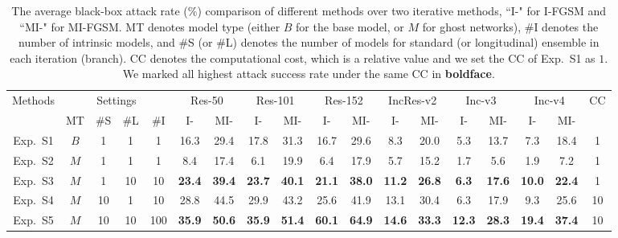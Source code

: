 \documentclass[letterpaper]{article} %
\begin{document}
\begin{table}[tb]
\centering
\small
\begin{tabular}{|c|cccc||cc|cc|cc|cc|cc|cc||c|}
\hline
\multirow{2}{*}{Methods} & \multicolumn{4}{c||}{Settings} & \multicolumn{2}{c|}{Res-50} & \multicolumn{2}{c|}{Res-101} & \multicolumn{2}{c|}{Res-152} & \multicolumn{2}{c|}{IncRes-v2} & \multicolumn{2}{c|}{Inc-v3} & \multicolumn{2}{c||}{Inc-v4} & \multirow{2}{*}{CC}\\
\cline{2-17}
& MT & \#S & \#L & \#I & I- & MI- & I- & MI- & I- & MI- & I- & MI- & I- & MI- & I- & MI- &\\
\hline
\hline
Exp.~S1 & $B$ & 1  & 1  &   1 & 16.3 & 29.4 & 17.8 & 31.3 & 16.7 & 29.6 &  8.3 & 20.0 &  5.3 & 13.7 &  7.3 & 18.4 & 1 \\
Exp.~S2 & $M$ & 1  & 1  &   1 &  8.4 & 17.4 &  6.1 & 19.9 &  6.4 & 17.9 &  5.7 & 15.2 &  1.7 &  5.6 &  1.9 &  7.2 & 1 \\
Exp.~S3 & $M$ & 1  & 10 &  10 & \textbf{23.4} & \textbf{39.4} & \textbf{23.7} & \textbf{40.1} & \textbf{21.1} & \textbf{38.0} & \textbf{11.2} & \textbf{26.8} &  \textbf{6.3} & \textbf{17.6} & \textbf{10.0} & \textbf{22.4} & 1 \\ \hline
Exp.~S4 & $M$ & 10 & 1  &  10 & 28.8 & 44.5 & 29.9 & 43.2 & 25.6 & 41.9 & 13.1 & 30.4 &  6.3 & 17.9 &  9.3 & 25.6 & 10 \\
Exp.~S5 & $M$ & 10 & 10 & 100 & \textbf{35.9} & \textbf{50.6} & \textbf{35.9} & \textbf{51.4} & \textbf{60.1} & \textbf{64.9} & \textbf{14.6} & \textbf{33.3} & \textbf{12.3} & \textbf{28.3} & \textbf{19.4} & \textbf{37.4} & 10 \\
\hline
\end{tabular}
\caption{The average black-box attack rate (\%) comparison of different methods over two iterative methods, ``I-" for I-FGSM and ``MI-" for MI-FGSM. MT denotes model type (either $B$ for the base model, or $M$ for ghost networks), \#I denotes the number of intrinsic models, and \#S (or \#L) denotes the number of models for standard (or longitudinal) ensemble in each iteration (branch). CC denotes the computational cost, which is a relative value and we set the CC of Exp.~S1 as $1$. We marked all highest attack success rate under the same CC in \textbf{boldface}.}
\label{table: SingleModelAttack}
\end{table}
\end{document}
